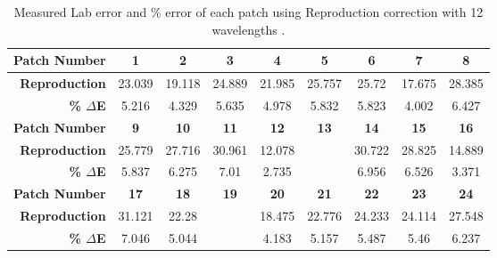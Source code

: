 \begin{table}[H]
  \caption{Measured Lab error and \% error of each patch using Reproduction correction with 12 wavelengths .}\n  \begin{center}
    \begin{tabularx}{\textwidth}{r c c c c c c c c}
    \toprule
        \textbf{Patch Number} & \textbf{1} & \textbf{2} & \textbf{3} & \textbf{4} & \textbf{5} & \textbf{6} & \textbf{7} & \textbf{8}\\ \midrule 
        \textbf{Reproduction} &23.039 &19.118 &24.889 &21.985 &25.757 &25.72 &17.675 &28.385\\ 
        \textbf{\textbf{\% $\Delta$E}} &5.216 &4.329 &5.635 &4.978 &5.832 &5.823 &4.002 &6.427\\ \midrule 
        \textbf{Patch Number} & \textbf{9} & \textbf{10} & \textbf{11} & \textbf{12} & \textbf{13} & \textbf{14} & \textbf{15} & \textbf{16}\\ \midrule 
        \textbf{Reproduction} &25.779 &27.716 &30.961 &12.078 &\cellcolor{colorred}{31.537} &30.722 &28.825 &14.889\\ 
        \textbf{\textbf{\% $\Delta$E}} &5.837 &6.275 &7.01 &2.735 &\cellcolor{colorred}{7.14} &6.956 &6.526 &3.371\\ \midrule 
        \textbf{Patch Number} & \textbf{17} & \textbf{18} & \textbf{19} & \textbf{20} & \textbf{21} & \textbf{22} & \textbf{23} & \textbf{24}\\ \midrule 
        \textbf{Reproduction} &31.121 &22.28 &\cellcolor{colorgreen}{5.415} &18.475 &22.776 &24.233 &24.114 &27.548\\ 
        \textbf{\textbf{\% $\Delta$E}} &7.046 &5.044 &\cellcolor{colorgreen}{1.226} &4.183 &5.157 &5.487 &5.46 &6.237\\ \midrule 
    \bottomrule
    \end{tabularx}
  \end{center}
\end{table}
